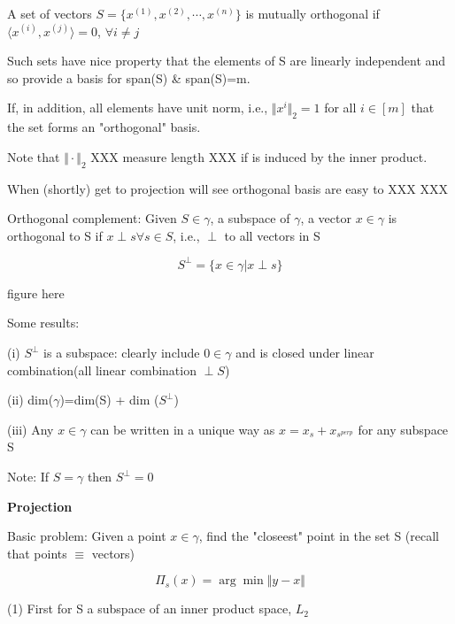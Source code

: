 A set of vectors $S=\{x^{(1)}, x^{(2)},\cdots, x^{(n)}\}$ is mutually orthogonal if $\langle x^{(i)},x^{(j)}\rangle =0$, $\forall i\neq j$
					
Such sets have nice property that the elements of S are linearly independent and so provide a basis for span(S) \& span(S)=m.

If, in addition, all elements have unit norm, i.e., $\Vert x^{i}\Vert_{2}=1$ for all $i\in[m]$ that the set forms an "orthogonal" basis.

Note that $\Vert\cdot\Vert_{2}$ XXX measure length XXX if is induced by the inner product.

When (shortly) get to projection will see orthogonal basis are easy to XXX XXX

\begin{marginfigure}
	\centering
	\resizebox{7.5cm}{3cm}{}
	\caption{}
	\label{}
\end{marginfigure}

\begin{marginfigure}
	\centering
	\resizebox{7.5cm}{3cm}{}
	\caption{}
	\label{}
\end{marginfigure}

Orthogonal complement: Given $S\in \gamma$, a subspace of $\gamma$, a vector $x\in\gamma$ is orthogonal to S if $x\perp s \forall s\in S$, i.e., $\perp$ to all vectors in S

$$ S^{\perp} =\{x\in\gamma|x\perp s\}$$

figure here

Some results:

(i) $S^{\perp}$ is a subspace: clearly include $0\in\gamma$ and is closed under linear combination(all linear combination $\perp S$)

(ii) dim($\gamma$)=dim(S) + dim ($S^{\perp}$)

(iii) Any $x\in\gamma$ can be written in a unique way as $x=x_{s}+x_{s^{perp}}$ for any subspace S

Note: If $S=\gamma$ then $S^{\perp}={0}$

\vspace{0.5cm}
\noindent\textbf{Projection}

Basic problem: Given a point $x\in\gamma$, find the "closeest" point in the set S (recall that points $\equiv$ vectors)

$$\Pi_{s}(x)=\arg \min \Vert y-x\Vert$$


(1) First for S a subspace of an inner product space, $L_{2}$

